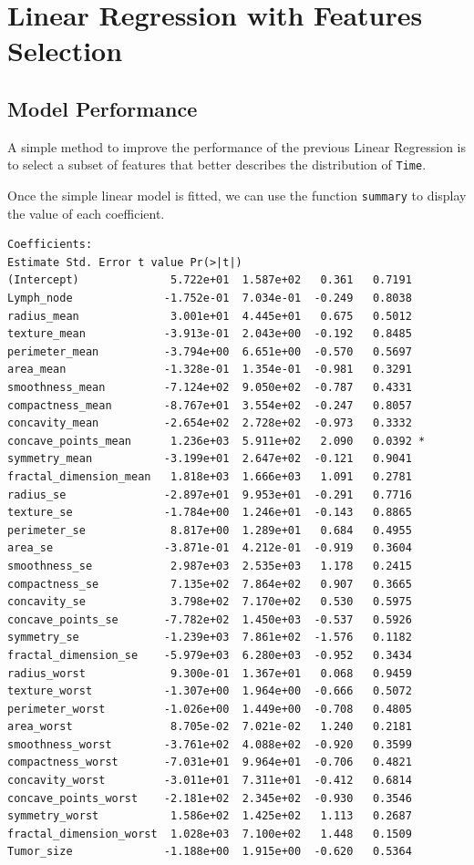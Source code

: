 \documentclass[]{report}
\newcommand{\inputtikz}[2]{%
	\scalebox{#1}{}  
}
\begin{document}
\begin{figure}[!h]
	\centering
	\inputtikz{0.5}{Figures/linreg_predicted.tex}
	\caption{}
	\label{fig:linreg_predicted}
\end{figure}

\section{Linear Regression with Features Selection}
\subsection{Model Performance}
A simple method to improve the performance of the previous Linear Regression is to select a subset of features that better describes the distribution of \texttt{Time}.

Once the simple linear model is fitted, we can use the function \texttt{summary} to display the value of each coefficient.
\begin{verbatim}
Coefficients:
Estimate Std. Error t value Pr(>|t|)  
(Intercept)              5.722e+01  1.587e+02   0.361   0.7191  
Lymph_node              -1.752e-01  7.034e-01  -0.249   0.8038  
radius_mean              3.001e+01  4.445e+01   0.675   0.5012  
texture_mean            -3.913e-01  2.043e+00  -0.192   0.8485  
perimeter_mean          -3.794e+00  6.651e+00  -0.570   0.5697  
area_mean               -1.328e-01  1.354e-01  -0.981   0.3291  
smoothness_mean         -7.124e+02  9.050e+02  -0.787   0.4331  
compactness_mean        -8.767e+01  3.554e+02  -0.247   0.8057  
concavity_mean          -2.654e+02  2.728e+02  -0.973   0.3332  
concave_points_mean      1.236e+03  5.911e+02   2.090   0.0392 *
symmetry_mean           -3.199e+01  2.647e+02  -0.121   0.9041  
fractal_dimension_mean   1.818e+03  1.666e+03   1.091   0.2781  
radius_se               -2.897e+01  9.953e+01  -0.291   0.7716  
texture_se              -1.784e+00  1.246e+01  -0.143   0.8865  
perimeter_se             8.817e+00  1.289e+01   0.684   0.4955  
area_se                 -3.871e-01  4.212e-01  -0.919   0.3604  
smoothness_se            2.987e+03  2.535e+03   1.178   0.2415  
compactness_se           7.135e+02  7.864e+02   0.907   0.3665  
concavity_se             3.798e+02  7.170e+02   0.530   0.5975  
concave_points_se       -7.782e+02  1.450e+03  -0.537   0.5926  
symmetry_se             -1.239e+03  7.861e+02  -1.576   0.1182  
fractal_dimension_se    -5.979e+03  6.280e+03  -0.952   0.3434  
radius_worst             9.300e-01  1.367e+01   0.068   0.9459  
texture_worst           -1.307e+00  1.964e+00  -0.666   0.5072  
perimeter_worst         -1.026e+00  1.449e+00  -0.708   0.4805  
area_worst               8.705e-02  7.021e-02   1.240   0.2181  
smoothness_worst        -3.761e+02  4.088e+02  -0.920   0.3599  
compactness_worst       -7.031e+01  9.964e+01  -0.706   0.4821  
concavity_worst         -3.011e+01  7.311e+01  -0.412   0.6814  
concave_points_worst    -2.181e+02  2.345e+02  -0.930   0.3546  
symmetry_worst           1.586e+02  1.425e+02   1.113   0.2687  
fractal_dimension_worst  1.028e+03  7.100e+02   1.448   0.1509  
Tumor_size              -1.188e+00  1.915e+00  -0.620   0.5364  
\end{verbatim}
\end{document}
